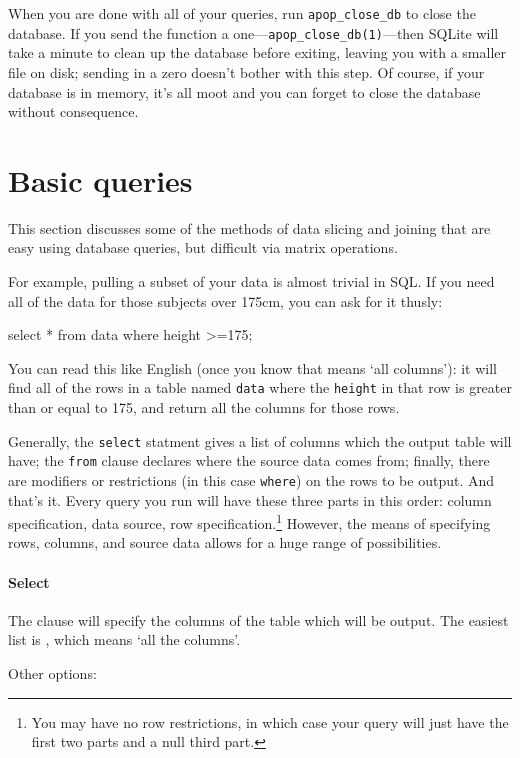 When you are done with all of your queries, run
{\tt apop\_close\_db} to close the database. If you send the function a
one---{\tt apop\_close\_db(1)}---then SQLite will take a minute to clean
up the database before exiting, leaving you with a smaller file on disk;
sending in a zero doesn't bother with this step. Of course, if your
database is in memory, it's all moot and you can forget to close the
database without consequence.

\section{Basic queries}
This section discusses some of the methods of data slicing and joining
that are easy using database queries, but difficult via
matrix operations.

For example, pulling a subset of your data is almost trivial in SQL. If
you need all of the data for those subjects over 175cm, you can ask for
it thusly:

select * 
   from data 
   where height >=175;

You can read this like English (once you know that {\tt *} means `all
columns'): it will find all of the rows in a table named {\tt data}
where the {\tt height} in that row is greater than or equal to 175, and
return all the columns for those rows.


Generally, the {\tt select} statment gives a list of columns which the output
table will have; the {\tt from} clause declares where the source data
comes from; finally, there are modifiers or restrictions (in this case
{\tt where}) on the rows to be output.  And that's it. Every query
you run will have these three parts in this order: column specification, data source,
row specification.\footnote{You may have
no row restrictions, in which case your query will just have the first
two parts and a null third part.} However, the means of specifying rows, columns, and
source data allows for a huge range of possibilities.

\paragraph{Select}
The  clause will specify the columns of the table which will
be output. The easiest list is {\tt *}, which means `all the columns'.

Other options:

